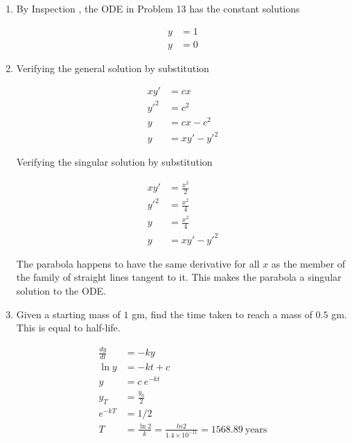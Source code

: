 \begin{enumerate}
    \item By Inspection , the ODE in Problem 13 has the constant solutions

          \begin{align}
              y & = 1 \\
              y & = 0
          \end{align}


    \item Verifying the general solution by substitution

          \begin{align}
              xy'    & = cx           \\
              y'^{2} & = c^{2}        \\
              y      & = cx - c^{2}   \\
              y      & = xy' - y'^{2}
          \end{align}

          Verifying the singular solution by substitution

          \begin{align}
              xy'    & = \frac{x^{2}}{2} \\
              y'^{2} & = \frac{x^{2}}{4} \\
              y      & = \frac{x^{2}}{4} \\
              y      & = xy' - y'^{2}
          \end{align}

          The parabola happens to have the same derivative for all $x$ as the member of the family of straight lines tangent to it. This makes the parabola a singular solution to the ODE.

    \item Given a starting mass of $1$ gm, find the time taken to reach a mass of $0.5$ gm. This is equal to half-life.

          \begin{align}
              \frac{dy}{dt} & = -ky                                                                           \\
              \ln y         & = -kt + c                                                                       \\
              y             & = c \ e^{-kt}                                                                   \\
              y_{T}         & = \frac{y_{0}}{2}                                                               \\
              e^{-kT}       & = 1/2                                                                           \\
              T             & = \frac{\ln 2}{k} = \frac{ln 2}{1.4 \times 10^{-11}} = 1568.89\  \mathrm{years}
          \end{align}



\end{enumerate}
